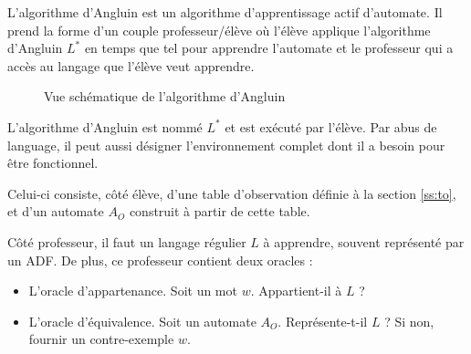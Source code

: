 L'algorithme d'Angluin\cite{Angluin87} est un algorithme d'apprentissage actif d'automate. Il prend la forme d'un couple professeur/élève où l'élève applique l'algorithme d'Angluin $L^*$ en temps que tel pour apprendre l'automate et le professeur qui a accès au langage que l'élève veut apprendre.

\begin{figure}[H]
	\centering
{}
\caption{Vue schématique de l'algorithme d'Angluin}
\end{figure}

L'algorithme d'Angluin est nommé $L^*$ et est exécuté par l'élève. Par abus de language, il peut aussi désigner l'environnement complet dont il a besoin pour être fonctionnel.

Celui-ci consiste, côté élève, d'une table d'observation définie à la section \ref{ss:to}, et d'un automate $A_O$ construit à partir de cette table.

Côté professeur, il faut un langage régulier $L$ à apprendre, souvent représenté par un ADF. De plus, ce professeur contient deux oracles :
\begin{itemize}
	\item L'oracle d'appartenance. Soit un mot $w$. Appartient-il à $L$ ?
	\item L'oracle d'équivalence. Soit un automate $A_O$. Représente-t-il $L$ ? Si non, fournir un contre-exemple $w$.
\end{itemize}

